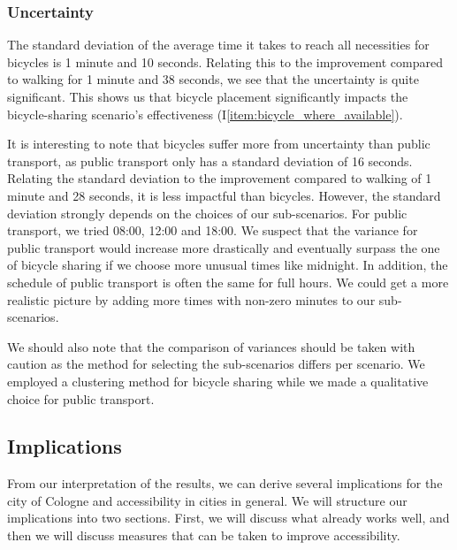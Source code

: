 \subsubsection{Uncertainty}

The standard deviation of the average time it takes to reach all necessities for bicycles is 1 minute and 10 seconds. 
Relating this to the improvement compared to walking for 1 minute and 38 seconds, we see that the uncertainty is quite significant.
This shows us that bicycle placement significantly impacts the bicycle-sharing scenario's effectiveness (I\ref{item:bicycle_where_available}).

It is interesting to note that bicycles suffer more from uncertainty than public transport, as public transport only has a standard deviation of 16 seconds.
Relating the standard deviation to the improvement compared to walking of 1 minute and 28 seconds, it is less impactful than bicycles.
However, the standard deviation strongly depends on the choices of our sub-scenarios. 
For public transport, we tried 08:00, 12:00 and 18:00.
We suspect that the variance for public transport would increase more drastically and eventually surpass the one of bicycle sharing if we choose more unusual times like midnight.
In addition, the schedule of public transport is often the same for full hours.
We could get a more realistic picture by adding more times with non-zero minutes to our sub-scenarios.

We should also note that the comparison of variances should be taken with caution as the method for selecting the sub-scenarios differs per scenario.
We employed a clustering method for bicycle sharing while we made a qualitative choice for public transport. 

\subsection{Implications}
\label{sec:implications}

From our interpretation of the results, we can derive several implications for the city of Cologne and accessibility in cities in general.
We will structure our implications into two sections. First, we will discuss what already works well, and then we will discuss measures that can be taken to improve accessibility.

